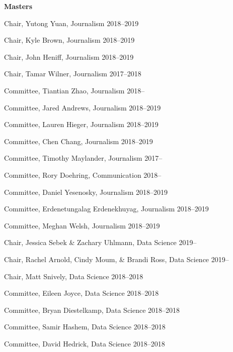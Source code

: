   \textbf{Masters}
    \begin{innerlist}
      \item Chair, Yutong Yuan, Journalism                                \hfill 2018--2019
      \item Chair, Kyle Brown, Journalism                                 \hfill 2018--2019
      \item Chair, John Heniff, Journalism                                \hfill 2018--2019
      \item Chair, Tamar Wilner, Journalism                               \hfill 2017--2018
      \item Committee, Tiantian Zhao, Journalism                          \hfill 2018--
      \item Committee, Jared Andrews, Journalism                          \hfill 2018--2019
      \item Committee, Lauren Hieger, Journalism                          \hfill 2018--2019
      \item Committee, Chen Chang, Journalism                             \hfill 2018--2019
      \item Committee, Timothy Maylander, Journalism                      \hfill 2017--
      \item Committee, Rory Doehring, Communication                       \hfill 2018--
      \item Committee, Daniel Yesenosky, Journalism                       \hfill 2018--2019
      \item Committee, Erdenetungalag Erdenekhuyag, Journalism            \hfill 2018--2019
      \item Committee, Meghan Welsh, Journalism                           \hfill 2018--2019

      \item Chair, Jessica Sebek \& Zachary Uhlmann, Data Science          \hfill 2019--
      \item Chair, Rachel Arnold, Cindy Moum, \& Brandi Ross, Data Science \hfill 2019--
      \item Chair, Matt Snively, Data Science                             \hfill 2018--2018
      \item Committee, Eileen Joyce, Data Science                         \hfill 2018--2018
      \item Committee, Bryan Diestelkamp, Data Science                    \hfill 2018--2018
      \item Committee, Samir Hashem, Data Science                         \hfill 2018--2018
      \item Committee, David Hedrick, Data Science                        \hfill 2018--2018
    \end{innerlist}\vspace{-.1in}
